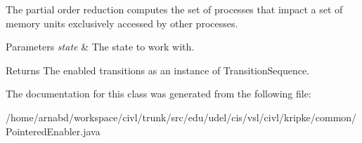 The partial order reduction computes the set of processes that impact a set of memory units exclusively accessed by other processes. 


\begin{DoxyParams}{Parameters}
{\em state} & The state to work with. \\
\hline
\end{DoxyParams}
\begin{DoxyReturn}{Returns}
The enabled transitions as an instance of Transition\+Sequence. 
\end{DoxyReturn}


The documentation for this class was generated from the following file\+:\begin{DoxyCompactItemize}
\item 
/home/arnabd/workspace/civl/trunk/src/edu/udel/cis/vsl/civl/kripke/common/Pointered\+Enabler.\+java\end{DoxyCompactItemize}
